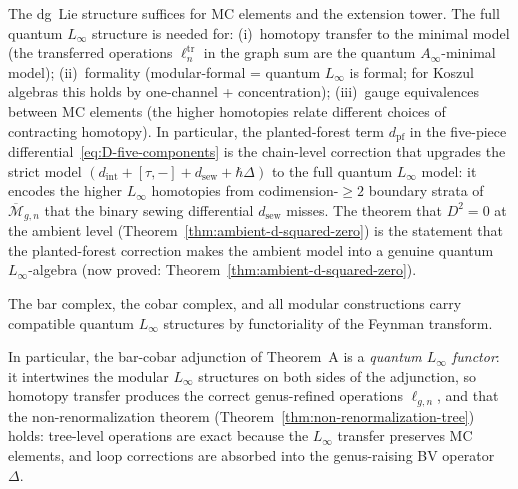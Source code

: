 \begin{remark}
\label{rem:full-homotopy-why}
The dg~Lie structure suffices for MC elements and the extension tower.
The full quantum $L_\infty$ structure is needed for:
\textup{(i)}~homotopy transfer to the minimal model (the transferred
operations $\ell_n^{\mathrm{tr}}$ in the graph sum are the quantum
$A_\infty$-minimal model);
\textup{(ii)}~formality (modular-formal = quantum $L_\infty$ is formal;
for Koszul algebras this holds by one-channel + concentration);
\textup{(iii)}~gauge equivalences between MC elements (the higher
homotopies relate different choices of contracting homotopy).
In particular, the planted-forest term $d_{\mathrm{pf}}$ in the
five-piece differential~\eqref{eq:D-five-components} is the
chain-level correction that upgrades the strict model
$(d_{\mathrm{int}} + [\tau,-] + d_{\mathrm{sew}} + \hbar\Delta)$
to the full quantum $L_\infty$ model: it encodes the higher
$L_\infty$ homotopies from codimension-${\geq}2$ boundary strata of
$\overline{\mathcal{M}}_{g,n}$ that the binary sewing differential
$d_{\mathrm{sew}}$ misses.  The theorem that $D^2 = 0$ at the
ambient level (Theorem~\ref{thm:ambient-d-squared-zero}) is
the statement that the planted-forest correction makes the ambient
model into a genuine quantum $L_\infty$-algebra
(now proved: Theorem~\ref{thm:ambient-d-squared-zero}).

The bar complex, the cobar complex, and all modular constructions
carry compatible quantum $L_\infty$ structures by functoriality of
the Feynman transform.

In particular, the bar-cobar adjunction of Theorem~A is a
\emph{quantum $L_\infty$ functor}: it intertwines the modular $L_\infty$
structures on both sides of the adjunction, so
homotopy transfer produces the correct genus-refined operations
$\ell_{g,n}$, and that the non-renormalization theorem
(Theorem~\ref{thm:non-renormalization-tree}) holds: tree-level
operations are exact because the $L_\infty$ transfer preserves MC
elements, and loop corrections are absorbed into the genus-raising
BV operator~$\Delta$.
\end{remark}

